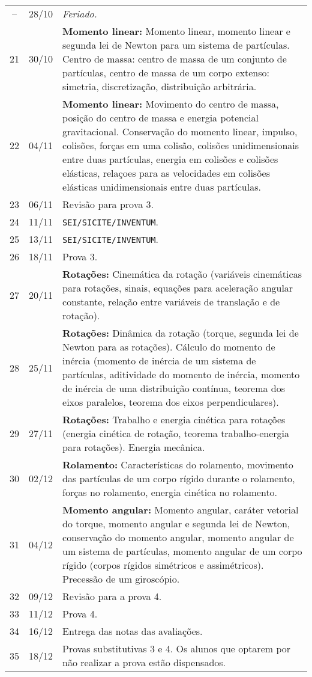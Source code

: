 \begin{center}
\begin{longtable}{ccp{70mm}}
 -- & 28/10 & \emph{Feriado.} \\
 21 & 30/10 & \textbf{Momento linear:} Momento linear, momento linear e segunda lei de Newton para um sistema de partículas. Centro de massa: centro de massa de um conjunto de partículas, centro de massa de um corpo extenso: simetria, discretização, distribuição arbitrária. \\
 22 & 04/11 & \textbf{Momento linear:} Movimento do centro de massa, posição do centro de massa e energia potencial gravitacional. Conservação do momento linear, impulso, colisões, forças em uma colisão, colisões unidimensionais entre duas partículas, energia em colisões e colisões elásticas, relaçoes para as velocidades em colisões elásticas unidimensionais entre duas partículas. \\ 
 23 & 06/11 & Revisão para prova 3. \\
 24 & 11/11 & \texttt{SEI/SICITE/INVENTUM}. \\
 25 & 13/11 & \texttt{SEI/SICITE/INVENTUM}. \\
 26 & 18/11 & Prova 3. \\
 27 & 20/11 & \textbf{Rotações:} Cinemática da rotação (variáveis cinemáticas para rotações, sinais, equações para aceleração angular constante, relação entre variáveis de translação e de rotação). \\
 28 & 25/11 & \textbf{Rotações:} Dinâmica da rotação (torque, segunda lei de Newton para as rotações). Cálculo do momento de inércia (momento de inércia de um sistema de partículas, aditividade do momento de inércia, momento de inércia de uma distribuição contínua, teorema dos eixos paralelos, teorema dos eixos perpendiculares). \\
 29 & 27/11 & \textbf{Rotações:} Trabalho e energia cinética para rotações (energia cinética de rotação, teorema trabalho-energia para rotações). Energia mecânica. \\
 30 & 02/12 & \textbf{Rolamento:} Características do rolamento, movimento das partículas de um corpo rígido durante o rolamento, forças no rolamento, energia cinética no rolamento. \\
 31 & 04/12 & \textbf{Momento angular:} Momento angular, caráter vetorial do torque, momento angular e segunda lei de Newton, conservação do momento angular, momento angular de um sistema de partículas, momento angular de um corpo rígido (corpos rígidos simétricos e assimétricos). Precessão de um giroscópio. \\
 32 & 09/12 & Revisão para a prova 4. \\
 33 & 11/12 & Prova 4. \\
 34 & 16/12 & Entrega das notas das avaliações. \\
 35 & 18/12 & Provas substitutivas 3 e 4. Os alunos que optarem por não realizar a prova estão dispensados.
\end{longtable}
\end{center}

\cleardoublepage
